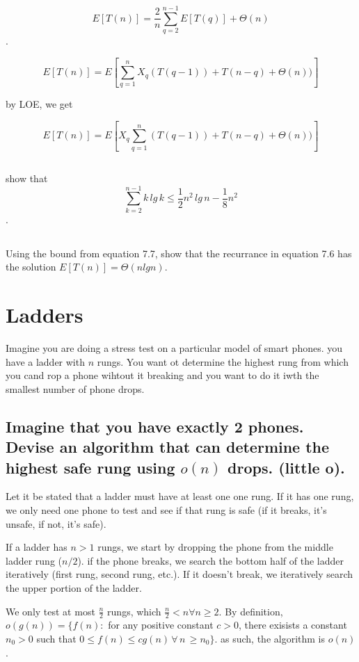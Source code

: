 \documentclass[titlepage]{article}\usepackage[]{graphicx}\usepackage[]{color}
\begin{document}
\[ E[T(n) ] = \frac{2}{n} \sum_{q=2}^{n-1} E[T(q)] + \Theta(n) \].


\[ E[T(n)] = E \left[ \sum_{q=1}^{n} X_q (T(q-1)) + T(n-q) + \Theta(n))\right] \]

by LOE, we get

\[ E[T(n)] = E \left[ X_q \sum_{q=1}^{n} (T(q-1)) + T(n-q) + \Theta(n))\right] \]



\subsection{}
show that 
\[ \sum_{k=2}^{n-1}k\, lg\, k \leq \frac{1}{2} n^2\, lg\, n - \frac{1}{8} n^2 \].

\subsection{}

Using the bound from equation 7.7, show that the recurrance in equation 7.6 has
the solution $E[T(n)] = \Theta(n lg n)$. 




\section{ Ladders }
  Imagine you are doing a stress test on a particular model of smart phones. you
  have a ladder with $n$ rungs. You want ot determine the highest rung from which
  you cand rop a phone wihtout it breaking and you want to do it iwth the
smallest number of phone drops. 

\subsection{ Imagine that you have exactly 2 phones. Devise an algorithm that
  can determine
the highest safe rung using $o(n)$ drops. (little o). }

  Let it be stated that a ladder must have at least one one rung. If it has
  one rung, we only need one phone to test and see if that rung is safe (if it
  breaks, it's unsafe, if not, it's safe).

  If a ladder has $n > 1$ rungs, we start by dropping the phone from the middle
  ladder rung ($n/2$). if the phone breaks, we search the bottom half of the
  ladder iteratively (first rung, second rung, etc.). If it doesn't break, we
  iteratively search the upper portion of the ladder. 

  We only test at most $\frac{n}{2}$ rungs, which $\frac{n}{2} < n
  \forall n \geq 2$. 
  By definition, $o(g(n)) = \{ f(n) : $ for any positive constant $c>0$, there
  exisists a constant $n_0 > 0$ such that $0 \leq f(n) \leq cg(n) \, \forall \,
  n \, \geq n_0\}$.
  as such, the algorithm is $o(n)$. 
\end{document}
